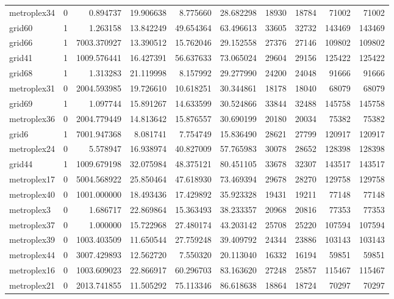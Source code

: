 \begin{longtable}{|l|r|r|r|r|r|r|r|r|r|}
metroplex34 & 0 & 0.894737 & 19.906638 & 8.775660 & 28.682298 & 18930 & 18784 & 71002 & 71002 \\
grid60 & 1 & 1.263158 & 13.842249 & 49.654364 & 63.496613 & 33605 & 32732 & 143469 & 143469 \\
grid66 & 1 & 7003.370927 & 13.390512 & 15.762046 & 29.152558 & 27376 & 27146 & 109802 & 109802 \\
grid41 & 1 & 1009.576441 & 16.427391 & 56.637633 & 73.065024 & 29604 & 29156 & 125422 & 125422 \\
grid68 & 1 & 1.313283 & 21.119998 & 8.157992 & 29.277990 & 24200 & 24048 & 91666 & 91666 \\
metroplex31 & 0 & 2004.593985 & 19.726610 & 10.618251 & 30.344861 & 18178 & 18040 & 68079 & 68079 \\
grid69 & 1 & 1.097744 & 15.891267 & 14.633599 & 30.524866 & 33844 & 32488 & 145758 & 145758 \\
metroplex36 & 0 & 2004.779449 & 14.813642 & 15.876557 & 30.690199 & 20180 & 20034 & 75382 & 75382 \\
grid6 & 1 & 7001.947368 & 8.081741 & 7.754749 & 15.836490 & 28621 & 27799 & 120917 & 120917 \\
metroplex24 & 0 & 5.578947 & 16.938974 & 40.827009 & 57.765983 & 30078 & 28652 & 128398 & 128398 \\
grid44 & 1 & 1009.679198 & 32.075984 & 48.375121 & 80.451105 & 33678 & 32307 & 143517 & 143517 \\
metroplex17 & 0 & 5004.568922 & 25.850464 & 47.618930 & 73.469394 & 29678 & 28270 & 129758 & 129758 \\
metroplex40 & 0 & 1001.000000 & 18.493436 & 17.429892 & 35.923328 & 19431 & 19211 & 77148 & 77148 \\
metroplex3 & 0 & 1.686717 & 22.869864 & 15.363493 & 38.233357 & 20968 & 20816 & 77353 & 77353 \\
metroplex37 & 0 & 1.000000 & 15.722968 & 27.480174 & 43.203142 & 25708 & 25220 & 107594 & 107594 \\
metroplex39 & 0 & 1003.403509 & 11.650544 & 27.759248 & 39.409792 & 24344 & 23886 & 103143 & 103143 \\
metroplex44 & 0 & 3007.429893 & 12.562720 & 7.550320 & 20.113040 & 16332 & 16194 & 59851 & 59851 \\
metroplex16 & 0 & 1003.609023 & 22.866917 & 60.296703 & 83.163620 & 27248 & 25857 & 115467 & 115467 \\
metroplex21 & 0 & 2013.741855 & 11.505292 & 75.113346 & 86.618638 & 18864 & 18724 & 70297 & 70297 \\

\end{longtable}
